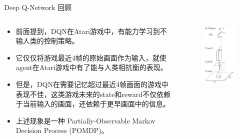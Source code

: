 \documentclass[10pt]{beamer}
\begin{document}
	\begin{frame}{Deep Q-Network 回顾}
		\begin{columns}
			\begin{column}{.6\linewidth}
				\begin{itemize}
					\item<2-> 前面提到，DQN在Atari游戏中，有能力学习到不输人类的控制策略。
					\item<3-> 它仅仅将游戏最近4帧的原始画面作为输入，就使agent在Atari游戏中有了能与人类相抗衡的表现。
					\item<4-> 但是，DQN在需要记忆\alert{超过最近4帧}画面的游戏中表现不佳，这类游戏未来的state和reward不仅依赖于当前输入的画面，还依赖于更早画面中的信息。
					\item<5-> 上述现象是一种 Partially-Observable Markov Decision Process (POMDP)。
				\end{itemize}
			\end{column}
			\begin{column}{.4\linewidth}
				\begin{figure}
					\centering
					\includegraphics[width=0.9\linewidth]{pictures/dqn-architecture-2}
				\end{figure}
				
			\end{column}
		\end{columns}
		
	\end{frame}
\end{document}
